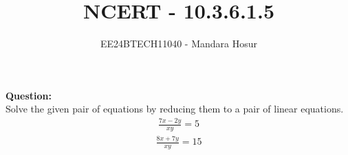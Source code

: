 \documentclass[journal]{IEEEtran}
\begin{document}

\vspace{3cm}

\title{NCERT - 10.3.6.1.5}
\author{EE24BTECH11040 - Mandara Hosur}
{\let\newpage\relax\maketitle}

\renewcommand{\thefigure}{\theenumi}
\renewcommand{\thetable}{\theenumi}
\setlength{\intextsep}{10pt} %


\renewcommand{\thetable}{\theenumi}

\textbf{Question:}\\
Solve the given pair of equations by reducing them to a pair of linear equations.
\begin{align}
    \frac{7x-2y}{xy} = 5
\end{align}
\begin{align}
    \frac{8x+7y}{xy} = 15
\end{align}
\end{document}
